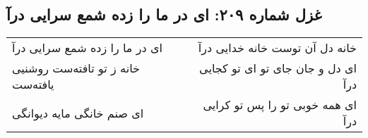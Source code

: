\begin{center}
\section*{غزل شماره ۲۰۹: ای در ما را زده شمع سرایی درآ}
\label{sec:0209}
\begin{longtable}{l p{0.5cm} r}
ای در ما را زده شمع سرایی درآ
&&
خانه دل آن توست خانه خدایی درآ
\\
خانه ز تو تافته‌ست روشنیی یافته‌ست
&&
ای دل و جان جای تو ای تو کجایی درآ
\\
ای صنم خانگی مایه دیوانگی
&&
ای همه خوبی تو را پس تو کرایی درآ
\\
\end{longtable}
\end{center}
